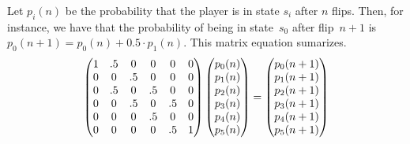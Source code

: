 \documentclass[c]{beamer}
\begin{document}
\begin{frame}

Let $p_{i}(n)$ be the probability that the player is in state $s_i$
after $n$ flips.
Then, for instance, we have that the probability of being in state~$s_0$
after flip~$n+1$ is
$p_{0}(n+1)=p_{0}(n)+0.5\cdot p_{1}(n)$.
This matrix equation sumarizes.
\begin{equation*}
  \begin{pmatrix}
      1  &.5 &0  &0  &0   &0  \\
      0  &0  &.5 &0  &0   &0  \\
      0  &.5 &0  &.5 &0   &0  \\
      0  &0  &.5 &0  &.5  &0  \\
      0  &0  &0  &.5 &0   &0  \\
      0  &0  &0  &0  &.5  &1
   \end{pmatrix}
   \begin{pmatrix} p_{0}(n) \\
        p_{1}(n) \\
        p_{2}(n) \\
        p_{3}(n) \\
        p_{4}(n) \\
        p_{5}(n) \end{pmatrix}
   =\begin{pmatrix} p_{0}(n+1) \\
        p_{1}(n+1) \\
        p_{2}(n+1) \\
        p_{3}(n+1) \\
        p_{4}(n+1) \\
        p_{5}(n+1) \end{pmatrix}
\end{equation*}
\end{frame}
\end{document}
